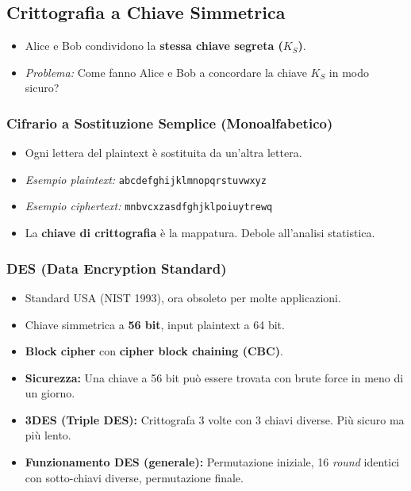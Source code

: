 \documentclass{article}
\begin{document}
\subsection{Crittografia a Chiave Simmetrica}
\begin{itemize}
    \item Alice e Bob condividono la \textbf{stessa chiave segreta ($K_S$)}.
    \item \textit{Problema:} Come fanno Alice e Bob a concordare la chiave $K_S$ in modo sicuro?
\end{itemize}

\subsubsection{Cifrario a Sostituzione Semplice (Monoalfabetico)}
\begin{itemize}
    \item Ogni lettera del plaintext è sostituita da un'altra lettera.
    \item \textit{Esempio plaintext:} \texttt{abcdefghijklmnopqrstuvwxyz}
    \item \textit{Esempio ciphertext:} \texttt{mnbvcxzasdfghjklpoiuytrewq}
    \item La \textbf{chiave di crittografia} è la mappatura. Debole all'analisi statistica.
\end{itemize}

\subsubsection{DES (Data Encryption Standard)}
\begin{itemize}
    \item Standard USA (NIST 1993), ora obsoleto per molte applicazioni.
    \item Chiave simmetrica a \textbf{56 bit}, input plaintext a 64 bit.
    \item \textbf{Block cipher} con \textbf{cipher block chaining (CBC)}.
    \item \textbf{Sicurezza:} Una chiave a 56 bit può essere trovata con brute force in meno di un giorno.
    \item \textbf{3DES (Triple DES):} Crittografa 3 volte con 3 chiavi diverse. Più sicuro ma più lento.
    \item \textbf{Funzionamento DES (generale):} Permutazione iniziale, 16 \textit{round} identici con sotto-chiavi diverse, permutazione finale.
\end{itemize}
\end{document}
